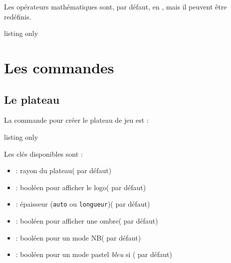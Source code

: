 \documentclass[11pt,a4paper]{ltxdoc}
\begin{document}
Les opérateurs mathématiques sont, par défaut, en \ShowCode{\\mathsf}, mais il peuvent être redéfinis.

\begin{DemoCode}{listing only}
\newcommand\intmathadorgrassf[1]{%
	\@ifpackageloaded{bm}{$\bm{\mathsf{#1}}$}{$\mathsf{#1}$}%
}
\def\mathadorplussymb{\intmathadorgrassf{\vphantom{-\times\div+}+}}
\def\mathadormoinssymb{\intmathadorgrassf{\vphantom{-\times\div+}-}}
\def\mathadorfoissymb{\intmathadorgrassf{\vphantom{-\times\div+}\times}}
\def\mathadordivsymb{\intmathadorgrassf{\vphantom{-\times\div+}\div}}
\end{DemoCode}

\section{Les commandes}

\subsection{Le plateau}

La commande pour créer le plateau de jeu est :

\begin{DemoCode}{listing only}
\end{DemoCode}

Les \textsf{clés} disponibles sont :

\begin{itemize}
	\item {} : rayon du plateau\hfill(\ShowCode{5cm} par défaut)
	\item {} : booléen pour afficher le logo\hfill( par défaut)
	\item {} : épaisseur (\texttt{auto} ou \texttt{longueur})\hfill( par défaut)
	\item {} : booléen pour afficher une ombre\hfill( par défaut)
	\item {} : booléen pour un mode NB\hfill( par défaut)
	\item {} : booléen pour un mode pastel \textit{bleu} si  \hfill( par défaut)
\end{itemize}

\begin{DemoCode}{}
\end{DemoCode}
\end{document}
